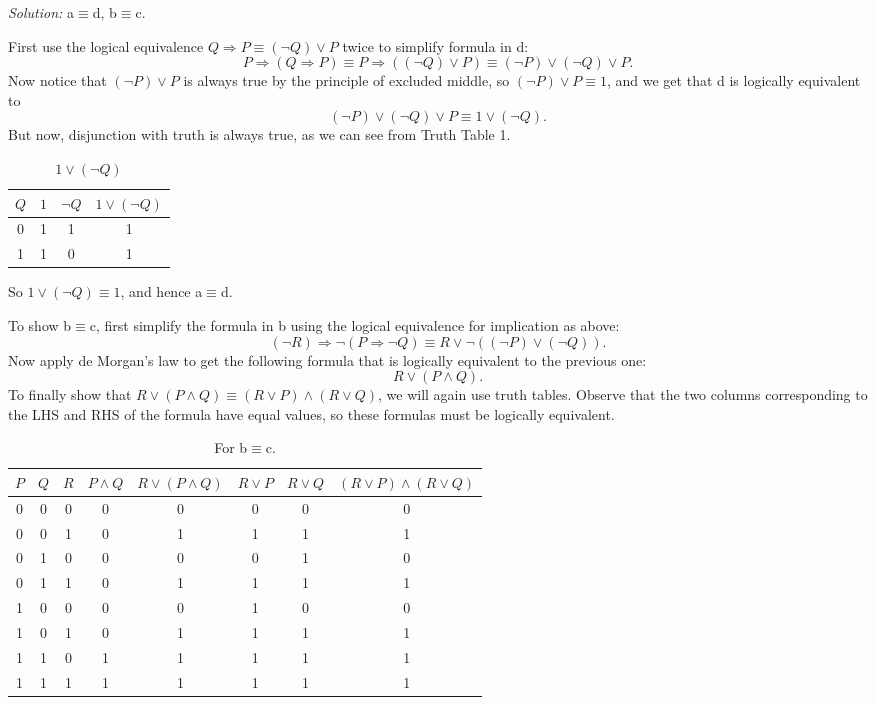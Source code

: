 \documentclass[12pt]{amsart}
\begin{document}
\begin{enumerate}[label=\arabic*.,itemsep=10pt, leftmargin=*]
\textit{Solution:} a$\equiv$d, b$\equiv$c.

First use the logical equivalence $Q \Rightarrow P \equiv (\neg Q) \vee P$ twice to simplify formula in d:
$$ P \Rightarrow (Q \Rightarrow P) \equiv
P \Rightarrow ((\neg Q) \vee P) \equiv
(\neg P) \vee (\neg Q) \vee P
.$$
Now notice that $(\neg P) \vee P$ is always true by the principle of excluded middle, so $(\neg P) \vee P \equiv 1$, and we get that d is logically equivalent to $$ (\neg P) \vee (\neg Q) \vee P \equiv
1 \vee (\neg Q)
.$$
But now, disjunction with truth is always true, as we can see from Truth Table 1.
\begin{table}[]
    \centering
    \begin{tabular}{|c|c|c|c|}
        \hline
        $Q$ & $1$ & $\neg Q$ & $1 \vee (\neg Q)$ \\
        \hline
        0 & 1 & 1 & 1 \\
        1 & 1 & 0 & 1 \\
        \hline
    \end{tabular}
    \caption{$1 \vee (\neg Q)$}
\end{table}

So $1 \vee (\neg Q) \equiv 1$, and hence a$\equiv$d.

To show b$\equiv$c, first simplify the formula in b using the logical equivalence for implication as above:
$$ (\neg R) \Rightarrow \neg(P \Rightarrow \neg Q)
\equiv
R \vee \neg(( \neg P) \vee (\neg Q))
.$$
Now apply de Morgan's law to get the following formula that is logically equivalent to the previous one:
$$ R \vee (P \wedge Q)
.$$
To finally show that $R \vee (P \wedge Q) \equiv (R \vee P) \wedge (R \vee Q)$, we will again use truth tables. Observe that the two columns corresponding to the LHS and RHS of the formula have equal values, so these formulas must be logically equivalent.

\begin{table}[]
    \centering
    \begin{tabular}{|c|c|c||c|c||c|c|c|}
        \hline
        $P$ & $Q$ & $R$ & $P\wedge Q$ & $R \vee (P \wedge Q)$
        & $R \vee P$ & $R \vee Q$ & $(R \vee P) \wedge (R \vee Q)$ \\
        \hline
        0&0&0 & 0&0 & 0&0&0 \\
        0&0&1 & 0&1 & 1&1&1 \\
        0&1&0 & 0&0 & 0&1&0 \\
        0&1&1 & 0&1 & 1&1&1 \\
        1&0&0 & 0&0 & 1&0&0 \\
        1&0&1 & 0&1 & 1&1&1 \\
        1&1&0 & 1&1 & 1&1&1 \\
        1&1&1 & 1&1 & 1&1&1 \\
        \hline
    \end{tabular}
    \caption{For b$\equiv$c.}
\end{table}



\end{enumerate}
\end{document}
